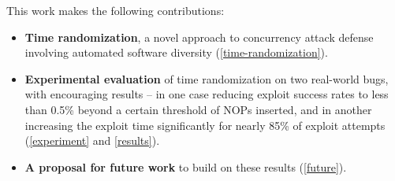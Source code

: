 This work makes the following contributions:
\begin{itemize}
	\item \textbf{Time randomization}, a novel approach to concurrency attack defense involving automated software diversity (\autoref{time-randomization}).
	\item \textbf{Experimental evaluation} of time randomization on two real-world bugs, with encouraging results -- in one case reducing exploit success rates to less than 0.5\% beyond a certain threshold of NOPs inserted, and in another increasing the exploit time significantly for nearly 85\% of exploit attempts (\autoref{experiment} and \autoref{results}).
	\item \textbf{A proposal for future work} to build on these results (\autoref{future}).
\end{itemize}
